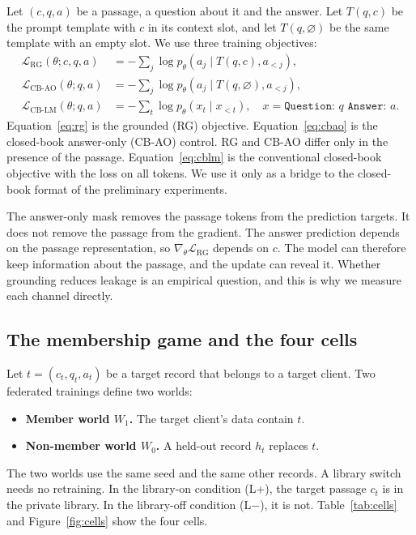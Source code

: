 \documentclass[11pt]{article}
\begin{document}
Let $(c,q,a)$ be a passage, a question about it and the answer. Let $T(q,c)$ be the prompt template with $c$ in its context slot, and let $T(q,\varnothing)$ be the same template with an empty slot. We use three training objectives:
\begin{align}
  \mathcal L_{\mathrm{RG}}(\theta;c,q,a)   &= -\textstyle\sum_{j}\log p_\theta\!\left(a_j\mid T(q,c),a_{<j}\right), \label{eq:rg}\\
  \mathcal L_{\mathrm{CB\text{-}AO}}(\theta;q,a) &= -\textstyle\sum_{j}\log p_\theta\!\left(a_j\mid T(q,\varnothing),a_{<j}\right), \label{eq:cbao}\\
  \mathcal L_{\mathrm{CB\text{-}LM}}(\theta;q,a) &= -\textstyle\sum_{t}\log p_\theta\!\left(x_t\mid x_{<t}\right),\quad x=\texttt{Question: }q\texttt{ Answer: }a. \label{eq:cblm}
\end{align}
Equation~\eqref{eq:rg} is the grounded (RG) objective. Equation~\eqref{eq:cbao} is the closed-book answer-only (CB-AO) control. RG and CB-AO differ only in the presence of the passage. Equation~\eqref{eq:cblm} is the conventional closed-book objective with the loss on all tokens. We use it only as a bridge to the closed-book format of the preliminary experiments.

The answer-only mask removes the passage tokens from the prediction targets. It does not remove the passage from the gradient. The answer prediction depends on the passage representation, so $\nabla_\theta\mathcal L_{\mathrm{RG}}$ depends on $c$. The model can therefore keep information about the passage, and the update can reveal it. Whether grounding reduces leakage is an empirical question, and this is why we measure each channel directly.

\subsection{The membership game and the four cells}\label{sec:game}

Let $t=(c_t,q_t,a_t)$ be a target record that belongs to a target client. Two federated trainings define two worlds:
\begin{itemize}
  \item \textbf{Member world $W_1$.} The target client's data contain $t$.
  \item \textbf{Non-member world $W_0$.} A held-out record $h_t$ replaces $t$.
\end{itemize}
The two worlds use the same seed and the same other records. A library switch needs no retraining. In the library-on condition (L+), the target passage $c_t$ is in the private library. In the library-off condition (L$-$), it is not. Table~\ref{tab:cells} and Figure~\ref{fig:cells} show the four cells.
\end{document}
